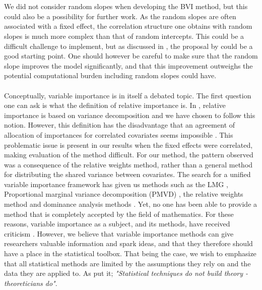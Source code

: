 \\
\\
We did not consider random slopes when developing the BVI method, but this could also be a possibility for further work. As the random slopes are often associated with a fixed effect, the correlation structure one obtains with random slopes is much more complex than that of random intercepts. This could be a difficult challenge to implement, but as discussed in , the proposal by \citet{Johnson2014} could be a good starting point. One should however be careful to make sure that the random slope improves the model significantly, and that this improvement outweighs the potential computational burden including random slopes could have.
\\
\\
Conceptually, variable importance is in itself a debated topic. The first question one can ask is what the definition of relative importance is. In \citet{gromping_relaimpo}, relative importance is based on variance decomposition and we have chosen to follow this notion. However, this definition has the disadvantage that an agreement of allocation of importances for correlated covariates seems impossible \citep{Gromping_2015}. This problematic issue is present in our results when the fixed effects were correlated, making evaluation of the method difficult. For our method, the pattern observed was a consequence of the relative weights method, rather than a general method for distributing the shared variance between covariates. The search for a unified variable importance framework has given us methods such as the LMG \citep{gromping_relaimpo}, Proportional marginal variance decomposition (PMVD) \citep{gromping_relaimpo}, the relative weights method \citep{johnson_relative_weights} and dominance analysis methods \citep{budescu1993dominance}. Yet, no one has been able to provide a method that is completely accepted by the field of mathematics. For these reasons, variable importance as a subject, and its methods, have received criticism \citep{gromping_relaimpo}. However, we believe that variable importance methods can give researchers valuable information and spark ideas, and that they therefore should have a place in the statistical toolbox. That being the case, we wish to emphasize that all statistical methods are limited by the assumptions they rely on and the data they are applied to. As \citet{Sutherland_91} put it; \textit{"Statistical techniques do not build theory - theoreticians do"}.


